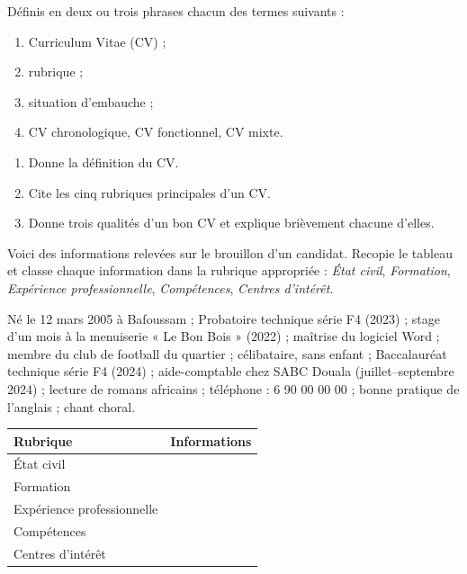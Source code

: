 \documentclass[11pt]{article}
\newcounter{popsec}
\newcounter{popsub}
\newcommand{\courssub}[1]{%
  \stepcounter{popsub}%
  \par\vspace{9pt}\noindent{\popxbold\fontsize{11.5}{13}\selectfont\color{popink}{\color{poporange}\thepopsec.\thepopsub}\hspace{6pt}#1}\par\nopagebreak\vspace{4pt}
}
\begin{document}
\begin{exercice}[Définitions]
Définis en deux ou trois phrases chacun des termes suivants :
\begin{enumerate}
\item Curriculum Vitae (CV) ;
\item rubrique ;
\item situation d'embauche ;
\item CV chronologique, CV fonctionnel, CV mixte.
\end{enumerate}
\end{exercice}

\begin{exercice}
\begin{enumerate}
\item Donne la définition du CV.
\item Cite les cinq rubriques principales d'un CV.
\item Donne trois qualités d'un bon CV et explique brièvement chacune d'elles.
\end{enumerate}
\end{exercice}

\courssub{Je m'entraîne}

\begin{exercice}
Voici des informations relevées sur le brouillon d'un candidat. Recopie le tableau et classe chaque information dans la rubrique appropriée : \emph{État civil}, \emph{Formation}, \emph{Expérience professionnelle}, \emph{Compétences}, \emph{Centres d'intérêt}.

Né le 12 mars 2005 à Bafoussam ; Probatoire technique série F4 (2023) ; stage d'un mois à la menuiserie « Le Bon Bois » (2022) ; maîtrise du logiciel Word ; membre du club de football du quartier ; célibataire, sans enfant ; Baccalauréat technique série F4 (2024) ; aide-comptable chez SABC Douala (juillet--septembre 2024) ; lecture de romans africains ; téléphone : 6 90 00 00 00 ; bonne pratique de l'anglais ; chant choral.

\begin{center}
\begin{tabularx}{\linewidth}{|l|X|}\hline
\rowcolor{popblueL} \textbf{Rubrique} & \textbf{Informations} \\ \hline
État civil & \\ \hline
Formation & \\ \hline
Expérience professionnelle & \\ \hline
Compétences & \\ \hline
Centres d'intérêt & \\ \hline
\end{tabularx}
\end{center}
\end{exercice}
\end{document}
